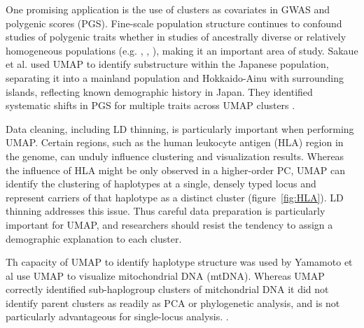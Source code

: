 \documentclass[12pt]{article}
\begin{document}
One promising application is the use of clusters as covariates in GWAS and polygenic scores (PGS). Fine-scale population structure continues to confound studies of polygenic traits whether in studies of ancestrally diverse or relatively homogeneous populations (e.g. \cite{kerminen2019geographic}, \cite{berg2019reduced}, \cite{sohail2019polygenic}), making it an important area of study. Sakaue et al. used UMAP to identify substructure within the Japanese population, separating it into a mainland population and Hokkaido-Ainu with surrounding islands, reflecting known demographic history in Japan\cite{sakaue_dimensionality_2020}. They identified systematic shifts in PGS for multiple traits across UMAP clusters . 

Data cleaning, including LD thinning, is particularly important when performing UMAP. Certain regions, such as the human leukocyte antigen (HLA) region in the genome, can unduly influence clustering and visualization results. Whereas the influence of HLA might be only observed in a higher-order PC, UMAP can identify the clustering of haplotypes at a single, densely typed locus and represent carriers of that haplotype as a distinct cluster (figure~\ref{fig:HLA}). LD thinning addresses this issue. Thus careful data preparation is particularly important for UMAP, and researchers should resist the tendency to assign a demographic explanation to each cluster. 

Th capacity of UMAP to identify haplotype structure was used by Yamamoto et al use UMAP to visualize mitochondrial DNA (mtDNA). Whereas UMAP correctly identified sub-haplogroup clusters of mitchondrial DNA it did not identify parent clusters as readily as PCA or phylogenetic analysis, and is not particularly advantageous for single-locus analysis. \cite{yamamoto_genetic_2020}. 
\end{document}
